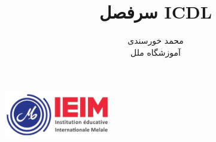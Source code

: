\documentclass{article}
\title{سرفصل ICDL}
\author{محمد خورسندی\\ آموزشگاه ملل}
\date{}
\begin{document}
\begin{center}
\includegraphics[height=2cm]{logo.png}
\end{center}
\maketitle






\end{document}
